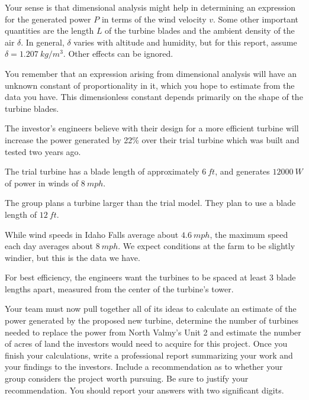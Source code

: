 \documentclass[11pt]{article}
\begin{document}
    \begin{compactitem}

        \item Your sense is that dimensional analysis might help in
        determining an expression for the generated power $P$ in terms of the
        wind velocity $v$. Some other important quantities are the length $L$ of the
        turbine blades and the ambient density of the air $\delta$. In
        general, $\delta$ varies with altitude and humidity, but for this
        report, assume $\delta = \SI{1.207}{kg/m^3}$. Other
        effects can be ignored.
        \item You remember that an expression arising from dimensional
        analysis will have an unknown constant of proportionality in it, which
        you hope to estimate from the data you have. This dimensionless
        constant depends primarily on the shape of the turbine blades.
        \item The investor's engineers believe with their design for a more
        efficient turbine will increase the power generated by 
        22\% over their trial turbine which was built and
        tested two years ago.
        \item The trial turbine has a blade length of approximately
        $\SI{6}{ft}$, and generates
        $\SI{12000}{W}$ of power in winds of
        $\SI{8}{mph}$.
        \item The group plans a turbine larger than the trial model. They plan
        to use a blade length of $\SI{12}{ft}$.
        \item While wind speeds in Idaho Falls average about
        $\SI{4.6}{mph}$, the maximum speed each day averages
        about $\SI{8}{mph}$. We expect conditions at the farm
        to be slightly windier, but this is the data we have.
        \item For best efficiency, the engineers want the turbines to be
        spaced at least $3$ blade lengths apart, measured from the center of
        the turbine's tower.

    \end{compactitem}


    Your team must now pull together all of its ideas to calculate an estimate
    of the power generated by the proposed new turbine, determine the number
    of turbines needed to replace the power from North Valmy's Unit
    2 and estimate the number of acres of land the investors would
    need to acquire for this project. Once you finish your calculations, write
    a professional report summarizing your work and your findings to the
    investors. Include a recommendation as to whether your group considers the
    project worth pursuing. Be sure to justify your recommendation. You should
    report your answers with two significant digits.
\end{document}
